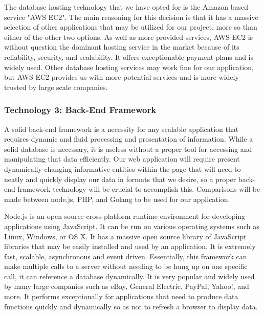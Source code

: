 	
		The database hosting technology that we have opted for is the Amazon based service "AWS EC2". The main reasoning for this decision is that it has a massive
		selection of other applications that may be utilized for our project, more so than either of the other two options. As well as more provided services, AWS EC2 is
		without question the dominant hosting service in the market because of its reliability, security, and scalability. It offers exceptionable payment plans and is
		widely used. Other database hosting services may work fine for our application, but AWS EC2 provides us with more potential services and is more widely trusted by large scale companies. 
	
	
\subsubsection{Technology 3: Back-End Framework}

	A solid back-end framework is a necessity for any scalable application that requires dynamic and fluid processing and presentation of information. While a solid
	database is necessary, it is useless without a proper tool for accessing and manipulating that data efficiently. Our  web application will require present dynamically 
	changing informative entities within the page that will need to neatly and quickly display our data in formats that we desire, so a proper back-end framework technology
	will be crucial to accomplish this. Comparisons will be made between node.js, PHP, and Golang to be used for our application.

	
		Node.js is an open source cross-platform runtime environment for developing applications using JavaScript. It can be run on various operating systems such as Linux, Windows, or OS X.
		It has a massive open source library of JavaScript libraries that may be easily installed and used by an application. It is extremely fast, scalable, asynchronous and
		event driven. Essentially, this framework can make multiple calls to a server without needing to be hung up on one specific call, it can reference a database dynamically. 
		It is very popular and widely used by many large companies such as eBay, General Electric, PayPal, Yahoo!, and more. It performs exceptionally for applications that need to produce data
		functions quickly and dynamically so as not to refresh a browser to display data. 
	
